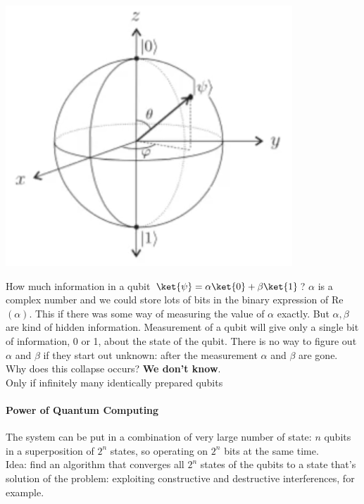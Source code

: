 \documentclass[10pt]{report}
\begin{document}
\begin{center}
	\includegraphics[scale=0.5]{5.png}
\end{center}
How much information in a qubit $\ket{\psi} = \alpha\ket{0} + \beta\ket{1}$? $\alpha$ is a complex number and we could store lots of bits in the binary expression of Re$(\alpha)$. This if there was some way of measuring the value of $\alpha$ exactly. But $\alpha,\beta$ are kind of hidden information. Measurement of a qubit will give only a single bit of information, 0 or 1, about the state of the qubit. There is no way to figure out $\alpha$ and $\beta$ if they start out unknown: after the measurement $\alpha$ and $\beta$ are gone.\\
Why does this collapse occurs? \textbf{We don't know}.\\
Only if infinitely many identically prepared qubits %
\paragraph{Power of Quantum Computing} The system can be put in a combination of very large number of state: $n$ qubits in a superposition of $2^n$ states, so operating on $2^n$ bits at the same time.\\
Idea: find an algorithm that converges all $2^n$ states of the qubits to a state that's solution of the problem: exploiting constructive and destructive interferences, for example.
\end{document}

